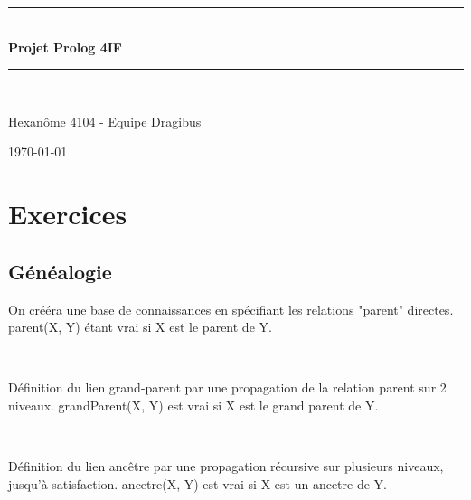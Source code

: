 \documentclass[a4paper, 11pt]{article}
\newcommand{\HRule}{\rule{\linewidth}{0.5mm}}
\newenvironment{DDbox}[1]{
\begin{lrbox}{\BBbox}\begin{minipage}{\linewidth}}
{\end{minipage}\end{lrbox}\noindent\colorbox{Zgris}{\usebox{\BBbox}} \\
[.5cm]}
\begin{document}
\begin{titlepage}
    \begin{center}
        \HRule \\[0.4cm]
        {\huge \bfseries Projet Prolog 4IF}
        \HRule \\[1.5cm]

        \begin{minipage}{0.8\textwidth}
            \center
            \large
            Hexanôme 4104 - Equipe Dragibus
        \end{minipage}

        \vfill
        {\large \today}
    \end{center}
\end{titlepage}

\tableofcontents
\newpage

\section{Exercices}
\subsection{Généalogie}
On crééra une base de connaissances en spécifiant les relations "parent"
directes. parent(X, Y) étant vrai si X est le parent de Y. \\
\begin{DDbox}{\linewidth}
    
\end{DDbox}

Définition du lien grand-parent par une propagation de la relation parent sur 2
niveaux. grandParent(X, Y) est vrai si X est le grand parent de Y. \\
\begin{DDbox}{\linewidth}
    
\end{DDbox}

Définition du lien ancêtre par une propagation récursive sur plusieurs
niveaux, jusqu'à satisfaction. ancetre(X, Y) est vrai si X est un ancetre de Y. \\
\begin{DDbox}{\linewidth}
    
\end{DDbox}
\end{document}
